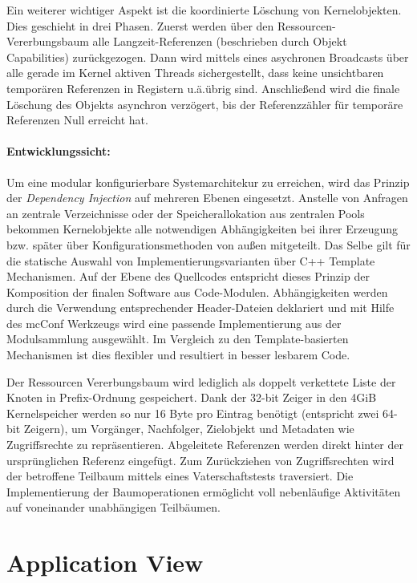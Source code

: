 Ein weiterer wichtiger Aspekt ist die koordinierte Löschung von Kernelobjekten. 
Dies geschieht in drei Phasen. Zuerst werden über den Ressourcen-Vererbungsbaum 
alle Langzeit-Referenzen (beschrieben durch Objekt Capabilities) zurückgezogen. 
Dann wird mittels eines asychronen Broadcasts über alle gerade im Kernel 
aktiven Threads sichergestellt, dass keine unsichtbaren temporären Referenzen 
in Registern u.ä.übrig sind. Anschließend wird die finale Löschung des Objekts 
asynchron verzögert, bis der Referenzzähler für temporäre Referenzen Null 
erreicht hat.

\paragraph{Entwicklungssicht:}
Um eine modular konfigurierbare Systemarchitekur zu erreichen, wird das Prinzip der \emph{Dependency Injection} auf mehreren Ebenen eingesetzt. Anstelle von Anfragen an zentrale Verzeichnisse oder der Speicherallokation aus zentralen Pools bekommen Kernelobjekte alle notwendigen Abhängigkeiten bei ihrer Erzeugung bzw. später über Konfigurationsmethoden von außen mitgeteilt. Das Selbe gilt für die statische Auswahl von Implementierungsvarianten über C++ Template Mechanismen. Auf der Ebene des Quellcodes entspricht dieses Prinzip der Komposition der finalen Software aus Code-Modulen. Abhängigkeiten werden durch die Verwendung entsprechender Header-Dateien deklariert und mit Hilfe des mcConf Werkzeugs wird eine passende Implementierung aus der Modulsammlung ausgewählt. Im Vergleich zu den Template-basierten Mechanismen ist dies flexibler und resultiert in besser lesbarem Code.  

Der Ressourcen Vererbungsbaum wird lediglich als doppelt verkettete Liste der Knoten in Prefix-Ordnung gespeichert. Dank der 32-bit Zeiger in den 4GiB Kernelspeicher werden so nur 16 Byte pro Eintrag benötigt (entspricht zwei 64-bit Zeigern), um Vorgänger, Nachfolger, Zielobjekt und Metadaten wie Zugriffsrechte zu repräsentieren. Abgeleitete Referenzen werden direkt hinter der ursprünglichen Referenz eingefügt. Zum Zurückziehen von Zugriffsrechten wird der betroffene Teilbaum mittels eines Vaterschaftstests traversiert. Die Implementierung der Baumoperationen ermöglicht voll nebenläufige Aktivitäten auf voneinander unabhängigen Teilbäumen. 



\section{Application View}
\label{sec:global-application-view}

